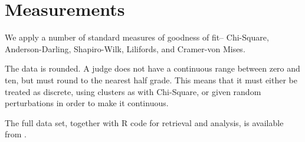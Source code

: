 \section{Measurements}
We apply a number of standard measures of goodness of fit--
Chi-Square, Anderson-Darling, Shapiro-Wilk, Lilifords, and Cramer-von Mises.

The data is rounded. A judge does not have a continuous range between
zero and ten, but must round to the nearest half grade. This means that
it must either be treated as discrete, using clusters as with Chi-Square,
or given random perturbations in order to make it continuous.

The full data set, together with R code for retrieval and analysis, is
available from \cite{acdstats}.
